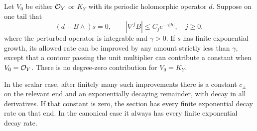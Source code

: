 \begin{lemma}\label{weighted:continuation}
Let $V_0$ be either $\mathcal O_Y$ or $K_Y$ with its periodic holomorphic
operator $d$. Suppose on one tail that
\[
 (d+B\wedge)s=0,\qquad
 |\nabla^jB|\le C_j e^{-\gamma|h|},\quad j\ge0,
\]
where the perturbed operator is integrable and $\gamma>0$. If $s$ has
finite exponential growth, its allowed rate can be improved by any
amount strictly less than $\gamma$, except that a contour passing the
unit multiplier can contribute a constant when $V_0=\mathcal O_Y$. There is
no degree-zero contribution for $V_0=K_Y$.

In the scalar case, after finitely many such improvements there is a
constant $c_\pm$ on the relevant end and an exponentially decaying
remainder, with decay in all derivatives. If that constant is zero,
the section has every finite exponential decay rate on that end. In
the canonical case it always has every finite exponential decay rate.
\end{lemma}

